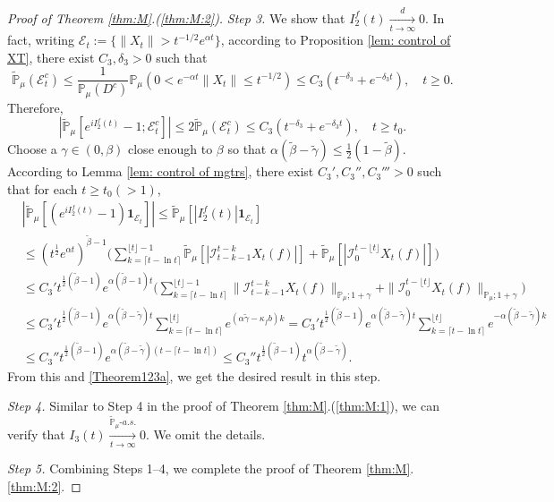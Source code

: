 \documentclass[EJP]{ejpecp} %
\begin{document}
\begin{proof}[Proof of Theorem \ref{thm:M}.(\ref{thm:M:2})]
	\emph{Step 3.} We show that $ I^f_2(t)\xrightarrow[t\to \infty]{d} 0$.
  	In fact, writing $\mathcal{E}_t:=\{\|X_t\|>t^{-1/2}e^{\alpha t}\}$, according to Proposition \ref{lem: control of XT}, there exist $C_3, \delta_3>0$ such that
\[
    \mathbb{\widetilde{P}}_{\mu}(\mathcal{E}^c_t)
    \leq \frac{1}{\mathbb{P}_{\mu}(D^c)}\mathbb{P}_{\mu}(0<e^{-\alpha t}\|X_t\|\leq t^{-1/2})\leq C_3( t^{-\delta_3}+e^{-\delta_3 t}),
    \quad t\geq0.
\]
	Therefore,
\begin{equation}
\label{Theorem123a}
    |\mathbb{\widetilde{P}}_{\mu}[e^{i I^f_2(t)}-1;\mathcal{E}^c_t]|
    \leq 2\mathbb{\widetilde{P}}_{\mu}(\mathcal{E}^c_t)
    \leq C_3(t^{-\delta_3}+e^{-\delta_3 t}),
    \quad t\geq t_0.
\end{equation}
	Choose a $\gamma\in (0,\beta)$ close enough to $\beta$ so that $\alpha(\tilde \beta - \tilde \gamma) \leq \frac{1}{2}(1- \tilde \beta)$.
	According to Lemma \ref{lem: control of mgtrs}, there exist $C_3',C_3'',C_3'''>0$ such that for each $t\geq t_0 (>1)$,
\begin{align}
    & |\mathbb{\widetilde{P}}_{\mu} [ (e^{i I^f_2(t)}-1)\mathbf{1}_{\mathcal{E}_t}]|
   	\leq  \mathbb{\widetilde{P}}_{\mu} [ |I^f_2(t)|\mathbf{1}_{\mathcal{E}_t}] \\
    & \leq  (t^{\frac{1}{2}} e^{\alpha t} )^{\tilde \beta - 1}\Big(\sum_{k=\lceil t-\ln t \rceil}^{\lfloor t \rfloor - 1}\mathbb{\widetilde{P}}_{\mu} [| \mathcal{I}_{t-k-1}^{t-k} X_t(f) |] + \mathbb{\widetilde{P}}_{\mu}[| \mathcal{I}_{0}^{t-\lfloor t\rfloor} X_t(f)|]\Big) \\
    & \leq C_3' t^{\frac{1}{2}(\tilde \beta - 1)} e^{\alpha(\tilde \beta - 1)t}\Big(\sum_{k=\lceil t-\ln t \rceil}^{\lfloor t \rfloor - 1}\|\mathcal{I}_{t-k-1}^{t-k} X_t(f) \|_{\mathbb P_\mu; 1+\gamma} + \|\mathcal I_0^{t-\lfloor t \rfloor} X_t(f)\|_{\mathbb P_\mu;1+\gamma}\Big) \\
    & \leq C_3' t^{\frac{1}{2}(\tilde \beta - 1)} e^{\alpha (\tilde \beta - \tilde \gamma)t}\sum_{k=\lceil t-\ln t \rceil}^{\lfloor t \rfloor}  e^{(\alpha\tilde \gamma-\kappa_f b)k}
   	= C_3' t^{\frac{1}{2}(\tilde \beta - 1)} e^{\alpha(\tilde \beta - \tilde \gamma) t}\sum_{k=\lceil t-\ln t \rceil}^{\lfloor t \rfloor}  e^{-\alpha (\tilde \beta -\tilde \gamma) k}
    \\ & \leq C_3'' t^{\frac{1}{2}(\tilde \beta - 1)} e^{\alpha (\tilde \beta - \tilde \gamma)(t - \lceil t - \ln t\rceil)}
  	\leq C_3'' t^{\frac{1}{2}(\tilde \beta - 1)} t^{\alpha (\tilde \beta - \tilde \gamma)}.
\end{align}
	From this and \eqref{Theorem123a}, we get the desired result in this step.

	\emph{Step 4.} Similar to Step 4 in the proof of Theorem \ref{thm:M}.(\ref{thm:M:1}), we can verify that $I_3(t) \xrightarrow[t\to \infty]{\widetilde {\mathbb P}_\mu \text{-} a.s.} 0$.
	We omit the details.

	\emph{Step 5.} Combining Steps 1--4, we complete the proof of Theorem \ref{thm:M}.\eqref{thm:M:2}.
\end{proof}
\end{document}
